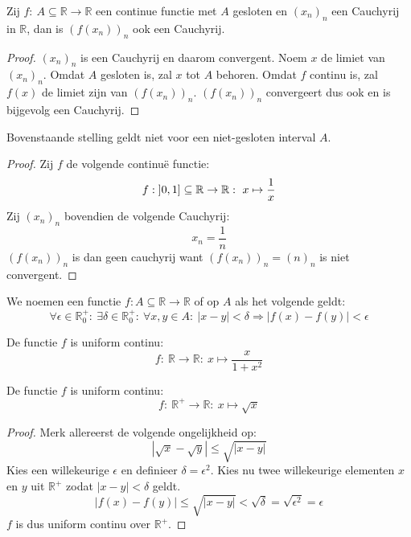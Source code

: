 \documentclass[main.tex]{subfiles}
\begin{document}
\begin{st}
  \label{st:continue-functie-over-gesloten-deel-behoudt-cauchy}
  Zij $f:\ A \subseteq \mathbb{R} \rightarrow \mathbb{R}$ een continue functie met $A$ gesloten en $(x_{n})_{n}$ een Cauchyrij in $\mathbb{R}$, dan is $(f(x_{n}))_{n}$ ook een Cauchyrij.

  \begin{proof}
    $(x_{n})_{n}$ is een Cauchyrij en daarom convergent.
    Noem $x$ de limiet van $(x_{n})_{n}$.
    Omdat $A$ gesloten is, zal $x$ tot $A$ behoren.
    Omdat $f$ continu is, zal $f(x)$ de limiet zijn van $(f(x_{n}))_{n}$.
    $(f(x_{n}))_{n}$ convergeert dus ook en is bijgevolg een Cauchyrij.
  \end{proof}
\end{st}

\begin{tvb}
  Bovenstaande stelling geldt niet voor een niet-gesloten interval $A$.

  \begin{proof}
    Zij $f$ de volgende continu\"e functie:
    \[ f: \interval[open left]{0}{1} \subseteq \mathbb{R} \rightarrow \mathbb{R}:\ x \mapsto \frac{1}{x} \]
    Zij $(x_{n})_{n}$ bovendien de volgende Cauchyrij:
    \[ x_{n} = \frac{1}{n} \]
    $(f(x_{n}))_{n}$ is dan geen cauchyrij want $(f(x_{n}))_{n} = (n)_{n}$ is niet convergent.
  \end{proof}
\end{tvb}

\begin{de}
  We noemen een functie $f: A \subseteq \mathbb{R} \rightarrow \mathbb{R}$  of  op $A$ als het volgende geldt:
  \[ \forall \epsilon \in \mathbb{R}_{0}^{+}:\ \exists \delta \in \mathbb{R}_{0}^{+}:\ \forall x,y \in A:\ |x-y| < \delta \Rightarrow |f(x)-f(y)| < \epsilon \]
\end{de}



\begin{vb}
  De functie $f$ is uniform continu:
  \[ f:\ \mathbb{R} \rightarrow \mathbb{R}:\ x \mapsto \frac{x}{1+x^{2}} \]
\end{vb}

\begin{vb}
  De functie $f$ is uniform continu:
  \[ f:\ \mathbb{R}^{+} \rightarrow \mathbb{R}:\ x \mapsto \sqrt{x} \]

  \begin{proof}
    Merk allereerst de volgende ongelijkheid op:
    \[ |\sqrt{x} - \sqrt{y}| \le \sqrt{|x-y|} \]
    Kies een willekeurige $\epsilon$ en definieer $\delta = \epsilon^{2}$.
    Kies nu twee willekeurige elementen $x$ en $y$ uit $\mathbb{R}^{+}$ zodat $|x-y|< \delta$ geldt.
    \[ |f(x) - f(y)| \le  \sqrt{|x-y|} < \sqrt{\delta} = \sqrt{\epsilon^{2}} = \epsilon \]
    $f$ is dus uniform continu over $\mathbb{R}^{+}$.
  \end{proof}
\end{vb}
\end{document}
